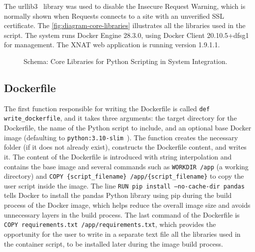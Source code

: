 The urllib3~\cite{urllib3} library was used to disable the Insecure Request Warning, which is normally shown when Requests connects to a site with an unverified SSL certificate. The \autoref{fig:diagram-core-libraries} illustrates all the libraries used in the script.
The system runs Docker Engine 28.3.0, using Docker Client 20.10.5+dfsg1 for management. The XNAT web application is running version 1.9.1.1.

\begin{figure}[H]
  \centering
  \def\svgwidth{0.4\linewidth}
  
  \caption{Schema: Core Libraries for Python Scripting in System Integration.}
  \label{fig:diagram-core-libraries}
\end{figure}
 
  \subsection{Dockerfile}
 
The first function responsible for writing the Dockerfile is called \texttt{def write\_dockerfile}, and it takes three arguments: the target directory for the Dockerfile, the name of the Python script to include, and an optional base Docker image (defaulting to \texttt{python:3.10-slim}~\cite{Dockerbaseimage}). The function creates the necessary folder (if it does not already exist), constructs the Dockerfile content, and writes it. The content of the Dockerfile is introduced with string interpolation and contains the base image and several commands such as \texttt{WORKDIR /app} (a working directory) and \texttt{COPY \{script\_filename\} /app/\{script\_filename\}} to copy the user script inside the image. The line \texttt{RUN pip install --no-cache-dir pandas} tells Docker to install the pandas Python library using pip during the build process of the Docker image, which helps reduce the overall image size and avoids unnecessary layers in the build process. The last command of the Dockerfile is \texttt{COPY requirements.txt /app/requirements.txt}, which provides the opportunity for the user to write in a separate text file all the libraries used in the container script, to be installed later during the image build process.





